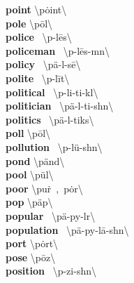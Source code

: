 \documentclass[10pt,a4paper]{article}
\begin{document}
\begin{multicols}{2}
\textbf{ point }\quad \textbackslash \textprimstress p\.{o}int\textbackslash \\
\textbf{ pole }\quad \textbackslash \textprimstress p\={o}l\textbackslash \\
\textbf{ police }\quad \ \textbackslash p\textschwa -\textprimstress l\={e}s\textbackslash \\
\textbf{ policeman }\quad \ \textbackslash p\textschwa -\textprimstress l\={e}s-m\textschwa n\textbackslash \\
\textbf{ policy }\quad \ \textbackslash \textprimstress p\"{a}-l\textschwa -s\={e}\textbackslash \\
\textbf{ polite }\quad \ \textbackslash p\textschwa -\textprimstress l\={i}t\textbackslash \\
\textbf{ political }\quad \ \textbackslash p\textschwa -\textprimstress li-ti-k\textschwa l\textbackslash \\
\textbf{ politician }\quad \ \textbackslash \textsecstress p\"{a}-l\textschwa -\textprimstress ti-sh\textschwa n\textbackslash \\
\textbf{ politics }\quad \ \textbackslash \textprimstress p\"{a}-l\textschwa -\textsecstress tiks\textbackslash \\
\textbf{ poll }\quad \textbackslash \textprimstress p\={o}l\textbackslash \\
\textbf{ pollution }\quad \ \textbackslash p\textschwa -\textprimstress l\"{u}-sh\textschwa n\textbackslash \\
\textbf{ pond }\quad \textbackslash \textprimstress p\"{a}nd\textbackslash \\
\textbf{ pool }\quad \textbackslash \textprimstress p\"{u}l\textbackslash \\
\textbf{ poor }\quad \textbackslash \textprimstress pu\. r\ ,\ \textprimstress p\.{o}r\textbackslash \\
\textbf{ pop }\quad \textbackslash \textprimstress p\"{a}p\textbackslash \\
\textbf{ popular }\quad \ \textbackslash \textprimstress p\"{a}-py\textschwa -l\textschwa r\textbackslash \\
\textbf{ population }\quad \ \textbackslash \textsecstress p\"{a}-py\textschwa -\textprimstress l\={a}-sh\textschwa n\textbackslash \\
\textbf{ port }\quad \textbackslash \textprimstress p\.{o}rt\textbackslash \\
\textbf{ pose }\quad \textbackslash \textprimstress p\={o}z\textbackslash \\
\textbf{ position }\quad \ \textbackslash p\textschwa -\textprimstress zi-sh\textschwa n\textbackslash \\

\end{multicols}
\end{document}
